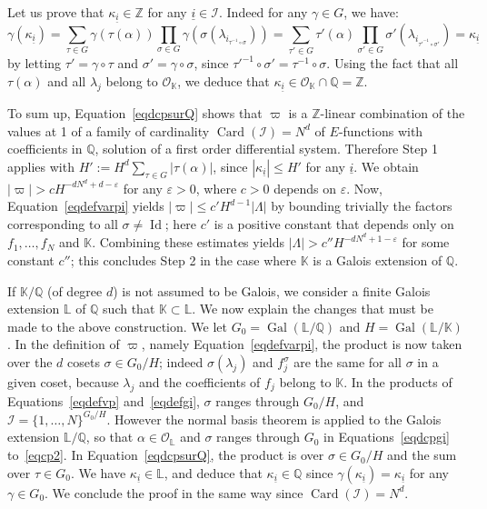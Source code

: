 \documentclass[JEP,XML,SOM,Unicode,published]{cedram}
\newcommand{\Efunctions}{$E$\nobreakdash-func\-tions\xspace}
\theoremstyle{definition}
\newcommand{\Z}{\mathbb{Z}}
\newcommand{\Q}{\mathbb{Q}}
\newcommand{\K}{\mathbb{K}}
\renewcommand{\L}{\mathbb{L}}
\newcommand{\Ok}{{\mathcal O}_{\K}}
\newcommand{\OL}{{\mathcal O}_{\L}}
\let\eps\varepsilon
\DeclareMathOperator{\Id}{Id}
\DeclareMathOperator{\Gal}{Gal}
\newcommand{\calI}{\mathcal I}
\DeclareMathOperator{\Card}{Card}
\newcommand{\isoul}{{\underline{i}}}
\begin{document}
Let us prove that $\kappa_{\isoul}\in \Z$ for any $ \isoul\in\calI$. Indeed for any $\gamma\in G$, we have:
\[
\gamma(\kappa_\isoul) = \sum_{\tau\in G}\gamma(\tau(\alpha)) \prod_{\sigma\in G} \gamma(\sigma(\lambda_{i_{\tau^{-1}\circ\sigma}}))
= \sum_{\tau'\in G}\tau'(\alpha)\prod_{\sigma'\in G} \sigma'(\lambda_{i_{\tau'^{-1}\circ\sigma'}}) = \kappa_{\isoul}
\]
by letting $ \tau' = \gamma\circ\tau$ and $\sigma'=\gamma\circ\sigma$, since $\tau'^{-1}\circ\sigma' = \tau^{-1}\circ\sigma$.
Using the fact that all $\tau(\alpha)$ and all $\lambda_j$ belong to $\Ok$, we deduce that $\kappa_\isoul\in \Ok\cap\Q=\Z$.

To sum up, Equation~\eqref{eqdcpsurQ} shows that $\varpi$ is a $\Z$-linear combination of the values at 1 of a family of cardinality $\Card ( \calI ) = N^d$ of \Efunctions with coefficients in $\Q$, solution of a first order differential system. Therefore Step 1 applies with $H' := H^d \sum_{\tau\in G}|\tau(\alpha)|$, since $|\kappa_\isoul|\leq H'$ for any $\isoul$. We obtain $| \varpi | > c H^{-dN^d+d-\eps}$ for any $\eps>0$, where $c>0$ depends on $\eps$.
Now, Equation~\eqref{eqdefvarpi} yields $| \varpi | \leq c' H^{d-1} |\Lambda|$ by bounding trivially the factors corresponding to all $\sigma\neq\Id$; here $c'$ is a positive constant that depends only on $f_1,\ldots,f_N$ and $\K$. Combining these estimates yields $|\Lambda|> c'' H^{- dN^d +1-\eps } $ for some constant $c''$; this concludes Step 2 in the case where $\K$ is a Galois extension of $\Q$.

If $\K/\Q$ (of degree $d$) is not assumed to be Galois, we consider a finite Galois extension $\L$ of $\Q$ such that $\K\subset \L$. We now explain the changes that must be made to the above construction. We let $G_0=\Gal(\L/\Q)$ and $H=\Gal(\L/\K)$. In the definition of $\varpi$, namely Equation~\eqref{eqdefvarpi}, the product is now taken over the $d$ cosets $\sigma\in G_0/H$; indeed $\sigma(\lambda_j)$ and $f_j^\sigma$ are the same for all $\sigma$ in a given coset, because $\lambda_j$ and the coefficients of $f_j$ belong to $\K$.
In the products of Equations~\eqref{eqdefvp} and~\eqref{eqdefgi}, $\sigma$ ranges through $G_0/H$, and $\calI = \{1,\ldots,N\}^{ G_0/H }$. However the normal basis theorem is applied to the Galois extension $\L/\Q$, so that $\alpha\in\OL$ and $\sigma$ ranges through $G_0$ in Equations~\eqref{eqdcpgi} to~\eqref{eqcp2}. In Equation~\eqref{eqdcpsurQ}, the product is over $\sigma\in G_0/H$ and the sum over $\tau\in G_0$. We have $\kappa_{\isoul}\in \L$, and deduce that $\kappa_{\isoul}\in \Q$ since $\gamma(\kappa_{\isoul}) = \kappa_{\isoul}$ for any $\gamma\in G_0$. We conclude the proof in the same way since $\Card(\calI)=N^d$.
\end{document}
